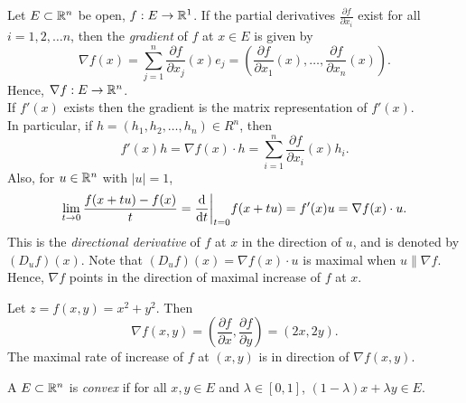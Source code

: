 \begin{define}[Gradient]
	Let $E \subset \mathbb{R}^{n}$ be open, $f: E\to \mathbb{R}^{1}$.
	If the partial derivatives $\frac{\partial f}{\partial x_{i}}$ exist for all $i=1,2,\ldots n$, then the \textit{gradient} of $f$ at $x \in E$ is given by
	\[
		\nabla f(x)=\sum_{j=1}^{n}{\frac{\partial f}{\partial x_{j}}(x)e_{j}}=
		\left(\frac{\partial f}{\partial x_{1}}(x),\ldots,\frac{\partial f}{\partial x_{n}}(x)\right)
		.\]
	Hence, $\nabla f: E\to \mathbb{R}^{n}$.\\
	If $f'(x)$ exists then the gradient is the matrix representation of $f'(x)$.\\
	In particular, if $h=(h_{1},h_{2},\ldots ,h_n) \in R^{n}$, then \[
		f'(x)h=\nabla f(x) \cdot h=\sum_{i=1}^{n}{\frac{\partial f}{\partial x_{i}}(x)h_{i}}
		.\]
	Also, for $u \in \mathbb{R}^{n}$ with $\left|u\right|=1$,
	\[
		\lim_{t\to 0}{\frac{f(x+tu)-f(x)}{t}}= \frac{\mathrm{d}}{\mathrm{d}t}\bigg{\rvert}_{t=0}{f(x+tu)}=f'(x)u=\nabla f(x) \cdot u
		.\]
	This is the \textit{directional derivative} of $f$ at $x$ in the direction of $u$, and is denoted by $(D_u f)(x)$.
	Note that $(D_u f)(x)=\nabla f(x) \cdot u$ is maximal when $u\parallel \nabla f$.
	Hence, $\nabla f$ points in the direction of maximal increase of $f$ at $x$.
\end{define}
\begin{example}
	Let $z=f(x,y)=x^2+y^2$. Then
	\[
		\nabla f(x,y)=\left(\frac{\partial f}{\partial x},\frac{\partial f}{\partial y}\right)=(2x,2y)
		.\]
	The maximal rate of increase of $f$ at $(x,y)$ is in direction of $\nabla f(x,y)$.
\end{example}

\begin{define}[Convexity]
	A $E \subset \mathbb{R}^{n}$ is \textit{convex} if for all $x,y \in E$ and $\lambda \in [0,1]$, $(1-\lambda) x+\lambda y \in E$.
\end{define}
\begin{example}

\end{example}


